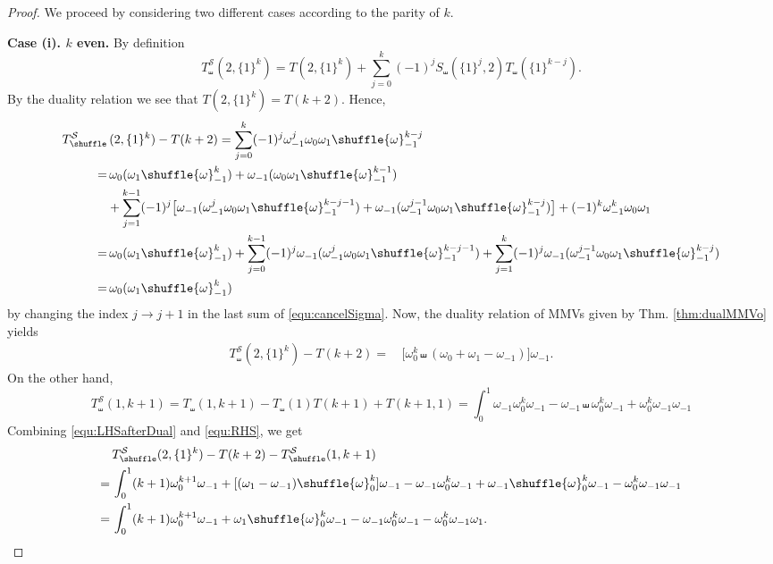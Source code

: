 \documentclass{article}
\newcommand{\sha}{\shuffle}
\newcommand{\Sy}{{\mathcal S}}
\newcommand\om{{\omega}}
\theoremstyle{plain}
\theoremstyle{definition}
\begin{document}
\begin{proof}
We proceed by considering two different cases according to the parity of $k$.


\medskip
\noindent
\textbf{Case (i). $k$ even.} By definition
\begin{equation*}
T_\sha^\Sy(2,\{1\}^k)=T(2,\{1\}^k)+\sum_{j=0}^k (-1)^j S_\sha(\{1\}^j,2)T_\sha(\{1\}^{k-j}).
\end{equation*}
By the duality relation \cite[Thm. 3.1]{KanekoTs2020} we see that $T(2,\{1\}^k)=T(k+2)$. Hence,
\begin{align}
T_\sha^\Sy&\, (2,\{1\}^k)-T(k+2)=\sum_{j=0}^k (-1)^j  \om_{-1}^j \om_0 \om_1 \sha \om_{-1}^{k-j}    \notag \\
=&\,  \om_0( \om_1 \sha \om_{-1}^{k})+\om_{-1}(\om_0 \om_1 \sha \om_{-1}^{k-1})    \notag\\
&  +\sum_{j=1}^{k-1} (-1)^j  \big[\om_{-1}(\om_{-1}^j \om_0 \om_1 \sha \om_{-1}^{k-j-1}) + \om_{-1}(\om_{-1}^{j-1} \om_0 \om_1 \sha \om_{-1}^{k-j})\big]  +(-1)^k \om_{-1}^k \om_0 \om_1    \notag\\
=&\,  \om_0( \om_1 \sha \om_{-1}^k)+ \sum_{j=0}^{k-1}(-1)^j \om_{-1}(\om_{-1}^j \om_0 \om_1 \sha \om_{-1}^{k-j-1} )
+\sum_{j=1}^{k} (-1)^j \om_{-1}(\om_{-1}^{j-1} \om_0 \om_1 \sha \om_{-1}^{k-j})   \label{equ:cancelSigma}\\
=&\,  \om_0( \om_1 \sha \om_{-1}^k )    \notag
\end{align}
by changing the index $j\to j+1$ in the last sum of \eqref{equ:cancelSigma}. Now, the duality relation of MMVs given by
Thm. \ref{thm:dualMMVo} yields
\begin{align} \label{equ:LHSafterDual}
T_\sha^\Sy (2,\{1\}^k)-T(k+2)=&\, \big[\om_0^k \sha (\om_0+\om_1-\om_{-1})\big] \om_{-1}.
\end{align}
On the other hand,
\begin{equation}\label{equ:RHS}
    T_\sha^\Sy(1,k+1)= T_\sha(1,k+1)-T_\sha(1)T(k+1)+T(k+1,1)
 =\int_0^1 \om_{-1}\om_0^{k}\om_{-1}-\om_{-1} \sha\om_0^{k}\om_{-1} + \om_0^{k}\om_{-1}\om_{-1}
\end{equation}
Combining \eqref{equ:LHSafterDual} and \eqref{equ:RHS}, we get
\begin{align}
&\, T_\sha^\Sy (2,\{1\}^k)-T(k+2)- T_\sha^\Sy(1,k+1)\notag\\
=&\,\int_0^1 (k+1) \om_0^{k+1}\om_{-1}+[(\om_1-\om_{-1}) \sha \om_0^k]\om_{-1} - \om_{-1}\om_0^{k}\om_{-1}+\om_{-1} \sha\om_0^{k}\om_{-1} -\om_0^{k}\om_{-1}\om_{-1} \notag\\
=&\,\int_0^1 (k+1) \om_0^{k+1}\om_{-1}+\om_1 \sha \om_0^k\om_{-1}- \om_{-1}\om_0^k\om_{-1} - \om_0^k\om_{-1}\om_1.\label{equ:LHSafterDual-RHS}

\end{align}
\end{proof}
\end{document}
